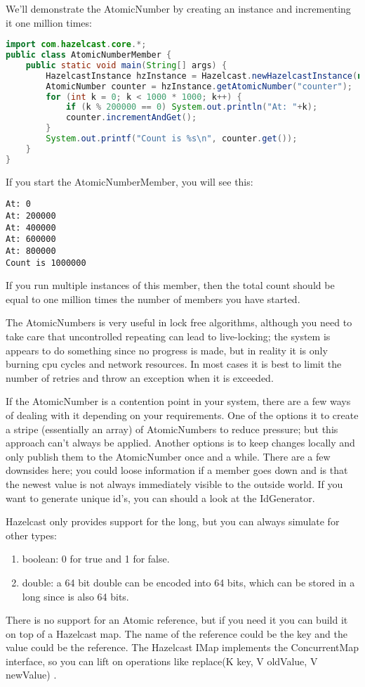 We'll demonstrate the AtomicNumber by creating an instance and incrementing it one million times:
\begin{lstlisting}[language=java]
import com.hazelcast.core.*;
public class AtomicNumberMember {
    public static void main(String[] args) {
        HazelcastInstance hzInstance = Hazelcast.newHazelcastInstance(null);
        AtomicNumber counter = hzInstance.getAtomicNumber("counter");
        for (int k = 0; k < 1000 * 1000; k++) {
            if (k % 200000 == 0) System.out.println("At: "+k);
            counter.incrementAndGet();
        }
        System.out.printf("Count is %s\n", counter.get());
    }
}
\end{lstlisting}
If you start the AtomicNumberMember, you will see this:
\begin{lstlisting}
At: 0
At: 200000
At: 400000
At: 600000
At: 800000
Count is 1000000
\end{lstlisting}
If you run multiple instances of this member, then the total count should be equal to one million times the number of members you have started.

The AtomicNumbers is very useful in lock free algorithms, although you need to take care that uncontrolled repeating can lead to live-locking; the system is appears to do something since no progress is made, but in reality it is only burning cpu cycles and network resources. In most cases it is best to limit the number of retries and throw an exception when it is exceeded.

If the AtomicNumber is a contention point in your system, there are a few ways of dealing with it depending on your requirements. One of the options it to create a stripe (essentially an array) of AtomicNumbers to reduce pressure; but this approach can't always be applied. Another options is to keep changes locally and only publish them to the AtomicNumber once and a while. There are a few downsides here; you could loose information if a member goes down and is that the newest value is not always immediately visible to the outside world. If you want to generate unique id's, you can should a look at the IdGenerator.

Hazelcast only provides support for the long, but you can always simulate for other types:
\begin{enumerate}
\item boolean: 0 for true and 1 for false.
\item double: a 64 bit double can be encoded into 64 bits, which can be stored in a long since is also 64 bits.
\end{enumerate}
There is no support for an Atomic reference, but if you need it you can build it on top of a Hazelcast map. The name of the reference could be the key and the value could be the reference. The Hazelcast IMap implements the ConcurrentMap interface, so you can lift on operations like replace(K key, V oldValue, V newValue) . 

